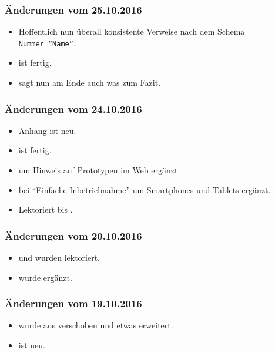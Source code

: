 \documentclass[paper=a4,fontsize=12pt,parskip=half,twoside]{scrartcl}
\begin{document}
\subsubsection*{Änderungen vom 25.10.2016}
\begin{itemize}[noitemsep]
\item Hoffentlich nun überall konsistente Verweise nach dem Schema \texttt{Nummer~"`Name"'}.
\item {} ist fertig.
\item {} sagt nun am Ende auch was zum Fazit.
\end{itemize}

\subsubsection*{Änderungen vom 24.10.2016}
\begin{itemize}[noitemsep]
\item Anhang  ist neu.
\item {} ist fertig.
\item {} um Hinweis auf Prototypen im Web ergänzt.
\item {} bei "`Einfache Inbetriebnahme"' um Smartphones und Tablets ergänzt.
\item Lektoriert bis .
\end{itemize}

\subsubsection*{Änderungen vom 20.10.2016}
\begin{itemize}[noitemsep]
\item {} und  wurden lektoriert.
\item {} wurde ergänzt.
\end{itemize}

\subsubsection*{Änderungen vom 19.10.2016}
\begin{itemize}[noitemsep]
\item {} wurde aus  verschoben und etwas erweitert.
\item {} ist neu.
\end{itemize}
\end{document}
